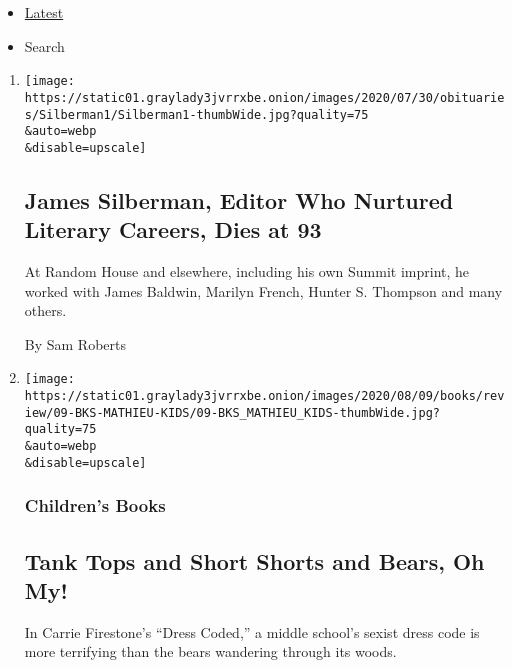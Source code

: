 \begin{itemize}
\tightlist
\item
  \protect\hyperlink{stream-panel}{Latest}
\item
  Search
\end{itemize}

\begin{enumerate}
\def\labelenumi{\arabic{enumi}.}
\item
  \href{/2020/08/01/books/james-silberman-dead.html}{}

  \texttt{[image: https://static01.graylady3jvrrxbe.onion/images/2020/07/30/obituaries/Silberman1/Silberman1-thumbWide.jpg?quality=75\\\&auto=webp\\\&disable=upscale]}

  \hypertarget{james-silberman-editor-who-nurtured-literary-careers-dies-at-93}{%
  \subsection{James Silberman, Editor Who Nurtured Literary Careers,
  Dies at
  93}\label{james-silberman-editor-who-nurtured-literary-careers-dies-at-93}}

  At Random House and elsewhere, including his own Summit imprint, he
  worked with James Baldwin, Marilyn French, Hunter S. Thompson and many
  others.

  By Sam Roberts
\item
  \href{/2020/08/01/books/review/carrie-firestone-dress-coded.html}{}

  \texttt{[image: https://static01.graylady3jvrrxbe.onion/images/2020/08/09/books/review/09-BKS-MATHIEU-KIDS/09-BKS\_MATHIEU\_KIDS-thumbWide.jpg?quality=75\\\&auto=webp\\\&disable=upscale]}

  \hypertarget{childrens-books}{%
  \subsubsection{Children's Books}\label{childrens-books}}

  \hypertarget{tank-tops-and-short-shorts-and-bears-oh-my}{%
  \subsection{Tank Tops and Short Shorts and Bears, Oh
  My!}\label{tank-tops-and-short-shorts-and-bears-oh-my}}

  In Carrie Firestone's ``Dress Coded,'' a middle school's sexist dress
  code is more terrifying than the bears wandering through its woods.


\end{enumerate}
